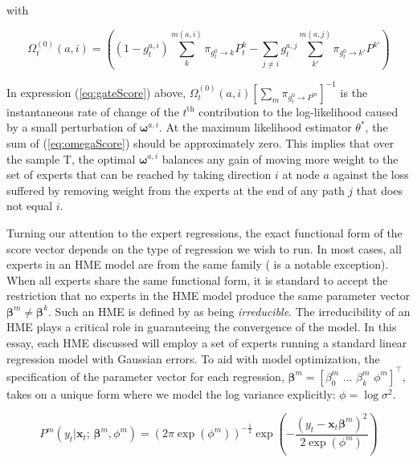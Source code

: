 \documentclass[12pt]{article}
\newcommand{\bw}[1]{\boldsymbol{\omega}^{#1}}
\newcommand{\gateprod}[2]{\pi_{#1 \longrightarrow #2}}
\newcommand{\FnOmegaNaught}[2]{\Omega^{(0)}_{t}( #1, #2 )}
\begin{document}
with

\begin{equation} \label{eq:omegaScore}
  \FnOmegaNaught{a}{i} = \left( (1 - g^{a, i}_{t}) \sum_{k}^{m(a, i)} \gateprod{g^{0}_{t}}{k} P^{k}_{t} - \sum_{j \neq i} g^{a,j}_{t} \sum_{k'}^{m(a, j)} \gateprod{g^{0}_{t}}{k'}  P^{k'} \right)
\end{equation}

In expression (\ref{eq:gateScore}) above, $ \FnOmegaNaught{a}{i} \left[ \sum_{m} \gateprod{g^{0}_{t}}{P^{m}} \right]^{-1}$
is the instantaneous rate of change of the $t^{\mathrm{th}}$ contribution to
the log-likelihood caused by a small perturbation of $\bw{a, i}$.
At the maximum likelihood estimator $ \theta^{*}$, the sum
of (\ref{eq:omegaScore}) should be approximately zero.
This implies that over the sample T, the optimal $\bw{a, i}$
balances any gain of moving more weight to the set of experts that can be
reached by taking direction $i$ at node $a$ against the loss suffered by 
removing weight from the experts at the end of any path $j$ that does not 
equal $i$.

\bigskip

Turning our attention to the expert regressions, the exact functional form
of the score vector depends on the type of regression we wish to run. In most
cases, all experts in an HME model are from the same family
(\citet{HuertaJiangTanner2003} is a notable exception). When all experts share
the same functional form, it is standard to accept the restriction that no experts
in the HME model produce the same parameter vector
$\boldsymbol{\beta}^{m} \neq \boldsymbol{\beta}^{k}$. Such an HME is defined by
\citet{JiangTanner2000} as being \textit{irreducible}. The irreducibility of an HME
plays a critical role in guaranteeing the convergence of the model.
In this essay, each HME discussed will employ a set of experts running 
a standard linear regression model with Gaussian errors. To aid with model optimization,
the specification of the parameter vector for each regression,
 $\boldsymbol{\beta}^{m} = [\beta_{0}^{m} \,\, \ldots \,\, \beta_{k}^m \,\, \phi^{m}]^{\top}$,
takes on a unique form where we model the log variance explicitly:
$\phi = \log \sigma^{2}$.

\begin{equation}
  P^{m}(y_{t} | \boldsymbol{x}_{t}; \, \boldsymbol{\beta}^{m}, \phi^{m}) = \left( 2 \pi \exp ( \phi^{m} ) \right)^{-\frac{1}{2}} \exp{ \left( -\frac{  ( y_{t} - \boldsymbol{x}_{t} \boldsymbol{\beta}^{m} )^{2}  }{2 \exp (\phi^{m}) } \right) }
\end{equation}
\end{document}

